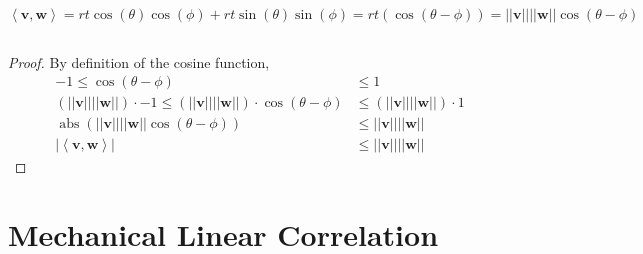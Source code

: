 \documentclass[]{article}
\newcommand{\iprod}[2]{\left\langle #1, #2 \right\rangle}
\renewcommand{\vec}[1]{\mathbf{#1}}
\begin{document}
\subsection{}

\begin{equation}
	\iprod{\vec{v}}{\vec{w}} = r t \cos(\theta) \cos(\phi) + r t \sin(\theta) \sin(\phi) = r t(\cos(\theta - \phi)) = ||\vec{v}|| ||\vec{w}|| \cos(\theta - \phi)
\end{equation}

\subsection{}

\begin{proof}
By definition of the cosine function, 
\begin{align}
	-1 \le \cos(\theta - \phi) &\le 1 \\
	(||\vec{v}|| ||\vec{w}||) \cdot -1 \le (||\vec{v}|| ||\vec{w}||) \cdot \cos(\theta - \phi) &\le (||\vec{v}|| ||\vec{w}||) \cdot 1 \\
	\operatorname{abs}(||\vec{v}|| ||\vec{w}|| \cos(\theta - \phi)) &\le ||\vec{v}|| ||\vec{w}|| \\
	|\iprod{\vec{v}}{\vec{w}}| &\le ||\vec{v}|| ||\vec{w}||
\end{align}
\end{proof}

\section{Mechanical Linear Correlation}


\subsection{}
\end{document}
